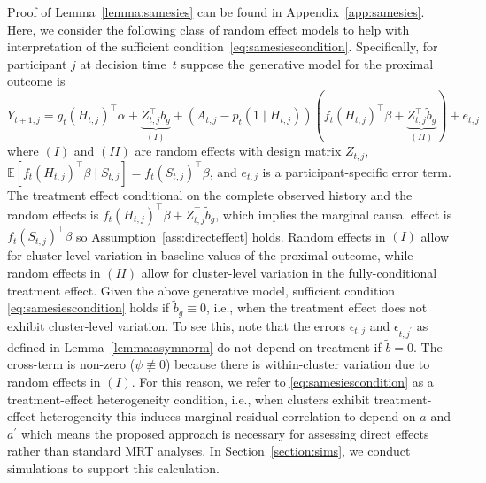\documentclass[12pt]{article}
\def\E{\mathbb{E}}
\begin{document}
Proof of Lemma~\ref{lemma:samesies} can be found in Appendix~\ref{app:samesies}. Here, we consider the following class of random effect models to help with interpretation of the sufficient condition~\eqref{eq:samesiescondition}.  Specifically, for participant $j$ at decision time~$t$ suppose the generative model for the proximal outcome is
$$
Y_{t+1,j} = g_t(H_{t,j})^\top \alpha + \underbrace{Z_{t,j}^\top b_g}_{(I)} + (A_{t,j} - p_t(1 \mid H_{t,j})) (f_t( H_{t,j})^\top \beta + \underbrace{Z_{t,j}^\top \tilde b_g}_{(II)}) + e_{t,j}
$$
where $(I)$ and $(II)$ are random effects with \textbf{}design matrix $Z_{t,j}$, $\E[ f_t(H_{t,j})^\top \beta \mid S_{t,j} ] = f_t(S_{t,j})^\top \beta$, and $e_{t,j}$ is a participant-specific error term.  The treatment effect conditional on the complete observed history and the random effects is $f_t( H_{t,j})^\top \beta + Z_{t,j}^\top \tilde b_g$, which implies  the marginal causal effect is $f_t (S_{t,j})^\top \beta$ so Assumption~\ref{ass:directeffect} holds.  Random effects in $(I)$ allow for cluster-level variation in baseline values of the proximal outcome, while random effects in $(II)$ allow for cluster-level variation in the fully-conditional treatment effect. Given the above generative model, sufficient condition \eqref{eq:samesiescondition} holds if $\tilde b_g \equiv 0$, i.e., when the treatment effect does not exhibit cluster-level variation. To see this, note that the errors $\epsilon_{t,j}$ and $\epsilon_{t,j^\prime}$ as defined in Lemma~\ref{lemma:asymnorm} do not depend on treatment if $\tilde b = 0$.  The cross-term is non-zero ($\psi \not \equiv 0$) because there is within-cluster variation due to random effects in $(I)$.  For this reason, we refer to \eqref{eq:samesiescondition} as a treatment-effect heterogeneity condition, i.e., when clusters exhibit treatment-effect heterogeneity this induces marginal residual correlation to depend on $a$ and $a^\prime$ which means the proposed approach is necessary for assessing direct effects rather than standard MRT analyses. In Section~\ref{section:sims}, we conduct simulations to support this calculation.

\end{document}
